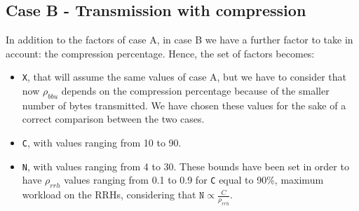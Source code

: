 \documentclass[11pt,a4paper,oneside, openright]{article}
\begin{document}
\subsection{Case B - Transmission with compression}
In addition to the factors of case A, in case B we have a further factor to take in account: the compression percentage. Hence, the set of factors becomes:

\begin{itemize}
	\item \texttt{X}, that will assume the same values of case A, but we have to consider that now $ \rho_{bbu} $ depends on the compression percentage because of the smaller number of bytes transmitted. We have chosen these values for the sake of a correct comparison between the two cases.
	\item \texttt{C}, with values ranging from 10 to 90. 
	\item \texttt{N}, with values ranging from 4 to 30. These bounds have been set in order to have $\rho_{rrh}$ values ranging from 0.1 to 0.9 for \texttt{C} equal to 90\%, maximum workload on the RRHs, considering that $\texttt{N} \propto \frac{C}{\rho_{rrh}}$.	
\end{itemize}
\end{document}
